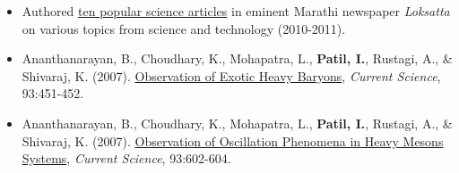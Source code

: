 \documentclass[10pt]{article}
\begin{document}
	\begin{itemize}
	
	\item Authored \href{https://drive.google.com/file/d/0B6_u70YpdJKnUUdoM2sydFRuTmNLaURUQ1FxaE9uTS1oVFRF/view?usp=sharing}{ten popular science articles} in eminent Marathi newspaper \textit{Loksatta} on various topics from science and technology (2010-2011). 
	
	\item Ananthanarayan, B., Choudhary, K., Mohapatra, L., \textbf{Patil, I.}, Rustagi, A., \& Shivaraj, K. (2007). \href{http://eprints.iisc.ernet.in/26860/1/current.pdf}{Observation of Exotic Heavy Baryons}, \textit{Current Science}, 93:451-452.
	
	\item Ananthanarayan, B., Choudhary, K., Mohapatra, L., \textbf{Patil, I.}, Rustagi, A., \& Shivaraj, K. (2007). \href{http://eprints.iisc.ernet.in/15428/1/Observation_of_oscillation.pdf}{Observation of Oscillation Phenomena in Heavy Mesons Systems}, \textit{Current Science}, 93:602-604.
	
	\end{itemize}
	
	
\end{document}
